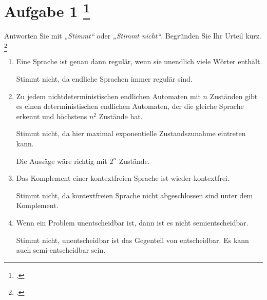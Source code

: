 \documentclass{lehramt-informatik-aufgabe}
\begin{document}
\liAufgabenTitel{}
\section{Aufgabe 1
\footcite{66115:2020:09}}


Antworten Sie mit \emph{„Stimmt“} oder \emph{„Stimmt nicht“}. Begründen
Sie Ihr Urteil kurz.
\footcite[Seite 55-56]{theo:fs:4}
\begin{enumerate}


\item Eine Sprache ist genau dann regulär, wenn sie unendlich viele
Wörter enthält.

\begin{liAntwort}
Stimmt nicht, da endliche Sprachen immer regulär sind.
\end{liAntwort}


\item Zu jedem nichtdeterministischen endlichen Automaten mit $n$
Zuständen gibt es einen deterministischen endlichen Automaten, der die
gleiche Sprache erkennt und höchstens $n^2$ Zustände hat.

\begin{liAntwort}
Stimmt nicht, da hier maximal exponentielle Zustandszunahme eintreten
kann.

Die Aussäge wäre richtig mit $2^n$ Zustände.
\end{liAntwort}


\item Das Komplement einer kontextfreien Sprache ist wieder kontextfrei.

\begin{liAntwort}
Stimmt nicht, da kontextfreien Sprache nicht abgeschlossen sind unter
dem Komplement.
\end{liAntwort}


\item Wenn ein Problem unentscheidbar ist, dann ist es nicht
semientscheidbar.

\begin{liAntwort}
Stimmt nicht, unentscheidbar ist das Gegenteil von entscheidbar. Es kann
auch semi-entscheidbar sein.
\end{liAntwort}


\end{enumerate}
\end{document}
